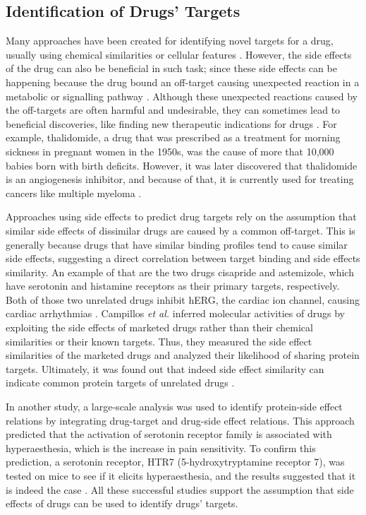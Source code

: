 \subsection{Identification of Drugs' Targets}

Many approaches have been created for identifying novel targets for a drug, usually using chemical similarities or cellular features \cite{campillos_drug_2008}.
However, the side effects of the drug can also be beneficial in such task; since these side effects can be happening because the drug bound an off-target causing unexpected reaction in a metabolic or signalling pathway \cite{lotfi_shahreza_review_2018}.
Although these unexpected reactions caused by the off-targets are often harmful and undesirable, they can sometimes lead to beneficial discoveries, like finding new therapeutic indications for drugs \cite{campillos_drug_2008}.
For example, thalidomide, a drug that was prescribed as a treatment for morning sickness in pregnant women in the 1950s, was the cause of more that 10,000 babies born with birth deficits.
However, it was later discovered that thalidomide is an angiogenesis inhibitor, and because of that, it is currently used for treating cancers like multiple myeloma \cite{vargesson_thalidomideinduced_2015}.

Approaches using side effects to predict drug targets rely on the assumption that similar side effects of dissimilar drugs are caused by a common off-target.
This is generally because drugs that have similar binding profiles tend to cause similar side effects, suggesting a direct correlation between target binding and side effects similarity.
An example of that are the two drugs cisapride and astemizole, which have serotonin and histamine receptors as their primary targets, respectively.
Both of those two unrelated drugs inhibit hERG, the cardiac ion channel, causing cardiac arrhythmias \cite{campillos_drug_2008}.
Campillos \textit{et al.} inferred molecular activities of drugs by exploiting the side effects of marketed drugs rather than their chemical similarities or their known targets.
Thus, they measured the side effect similarities of the marketed drugs and analyzed their likelihood of sharing protein targets.
Ultimately, it was found out that indeed side effect similarity can indicate common protein targets of unrelated drugs \cite{campillos_drug_2008}.

In another study, a large-scale analysis was used to identify protein-side effect relations by integrating drug-target and drug-side effect relations.
This approach predicted that the activation of serotonin receptor family is associated with hyperaesthesia, which is the increase in pain sensitivity.
To confirm this prediction, a serotonin receptor, HTR7 (5-hydroxytryptamine receptor 7), was tested on mice to see if it elicits hyperaesthesia, and the results suggested that it is indeed the case \cite{kuhn_systematic_2014}.
All these successful studies support the assumption that side effects of drugs can be used to identify drugs' targets.


